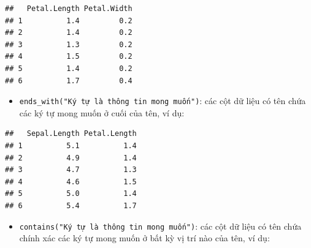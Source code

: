 \documentclass[]{krantz}
\makeatletter
\newenvironment{Shaded}{\begin{snugshade}}{\end{snugshade}}
\newcommand{\KeywordTok}[1]{\textcolor[rgb]{0.27,0.27,0.27}{\textbf{#1}}}
\newcommand{\NormalTok}[1]{#1}
\newcommand{\OperatorTok}[1]{\textcolor[rgb]{0.43,0.43,0.43}{\textbf{#1}}}
\newcommand{\StringTok}[1]{\textcolor[rgb]{0.5,0.5,0.5}{#1}}
\providecommand{\tightlist}{%
  \setlength{\itemsep}{0pt}\setlength{\parskip}{0pt}}
\newenvironment{kframe}{%
\medskip{}
\setlength{\fboxsep}{.8em}
 \def\at@end@of@kframe{}%
 \ifinner\ifhmode%
  \def\at@end@of@kframe{\end{minipage}}%
  \begin{minipage}{\columnwidth}%
 \fi\fi%
 \def\FrameCommand##1{\hskip\@totalleftmargin \hskip-\fboxsep
 \colorbox{shadecolor}{##1}\hskip-\fboxsep
     \hskip-\linewidth \hskip-\@totalleftmargin \hskip\columnwidth}%
 \MakeFramed {\advance\hsize-\width
   \@totalleftmargin\z@ \linewidth\hsize
   \@setminipage}}%
 {\par\unskip\endMakeFramed%
 \at@end@of@kframe}
\renewenvironment{Shaded}{\begin{kframe}}{\end{kframe}}
\renewenvironment{Shaded}{\begin{snugshade}}{\end{snugshade}}
\renewcommand{\KeywordTok}[1]{\textcolor[rgb]{0.13,0.29,0.53}{\textbf{#1}}}
\renewcommand{\NormalTok}[1]{#1}
\renewcommand{\OperatorTok}[1]{\textcolor[rgb]{0.81,0.36,0.00}{\textbf{#1}}}
\renewcommand{\StringTok}[1]{\textcolor[rgb]{0.31,0.60,0.02}{#1}}
\theoremstyle{definition}
\theoremstyle{definition}
\theoremstyle{definition}
\theoremstyle{remark}
\makeatother
\begin{document}
\begin{Shaded}
\end{Shaded}

\begin{verbatim}
##   Petal.Length Petal.Width
## 1          1.4         0.2
## 2          1.4         0.2
## 3          1.3         0.2
## 4          1.5         0.2
## 5          1.4         0.2
## 6          1.7         0.4
\end{verbatim}

\begin{itemize}
\tightlist
\item
  \texttt{ends\_with("Ký\ tự\ là\ thông\ tin\ mong\ muốn")}: các cột dữ
  liệu có tên chứa các ký tự mong muốn ở cuối của tên, ví dụ:
\end{itemize}

\begin{Shaded}
\end{Shaded}

\begin{verbatim}
##   Sepal.Length Petal.Length
## 1          5.1          1.4
## 2          4.9          1.4
## 3          4.7          1.3
## 4          4.6          1.5
## 5          5.0          1.4
## 6          5.4          1.7
\end{verbatim}

\begin{itemize}
\tightlist
\item
  \texttt{contains("Ký\ tự\ là\ thông\ tin\ mong\ muốn")}: các cột dữ
  liệu có tên chứa chính xác các ký tự mong muốn ở bất kỳ vị trí nào của
  tên, ví dụ:
\end{itemize}

\begin{Shaded}
\end{Shaded}
\end{document}
